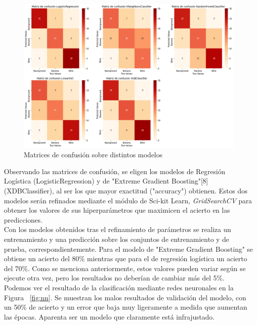 \documentclass{esannV2}
\begin{document}
\begin{figure}[b!]
\centering
\includegraphics[scale=0.3]{img/matrices_confusion.png}
\caption{Matrices de confusión sobre distintos modelos}\label{fig:cm}
\end{figure}




Observando las matrices de confusión, se eligen los modelos de Regresión Logística (LogisticRegression) y de "Extreme Gradient Boosting"[8]  (XDBClassifier), al ser los que mayor exactitud ("accuracy") obtienen. Estos dos modelos serán refinados mediante el módulo de Sci-kit Learn, \textit{GridSearchCV} para obtener los valores de sus hiperparámetros  que maximicen el acierto en las predicciones. \\
Con los modelos obtenidos tras el refinamiento de parámetros se realiza un entrenamiento y una predicción sobre los conjuntos de entrenamiento y de prueba, correspondientemente. Para el modelo de "Extreme Gradient Boosting" se obtiene un acierto del 80\% mientras que para el de regresión logística un acierto del 70\%. Como se menciona anteriormente, estos valores pueden variar según se ejecute otra vez, pero los resultados no deberían de cambiar más del 5\%. \\

Podemos ver el resultado de la clasificación mediante redes neuronales en la Figura ~\ref{fig:nn}. Se muestran los malos resultados de validación del modelo, con un 50\% de acierto y un error que baja muy ligeramente a medida que aumentan las épocas.  Aparenta ser un modelo que claramente está infrajustado. \\
\end{document}
